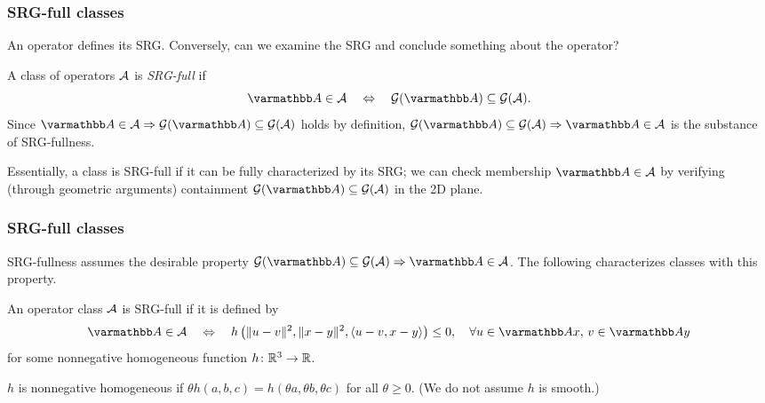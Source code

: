 \documentclass[10pt,mathserif]{beamer}
\begin{document}
\begin{frame}
\frametitle{SRG-full classes} 
An operator defines its SRG.
Conversely, can we examine the SRG and conclude something about the operator?

\vspace{0.2in}

A class of operators ${\mathcal{A}}$ is \emph{SRG-full} if
%
\[
\opA\in \cA
\quad\Leftrightarrow\quad
\cG(\opA)\subseteq\cG(\cA).
\]
%
Since $\opA\in \cA\Rightarrow\cG(\opA)\subseteq \cG(\cA)$ holds by definition, $\cG(\opA)\subseteq \cG(\cA)\Rightarrow \opA\in \cA$ is the substance of SRG-fullness.

\vspace{0.2in}

Essentially, a class is SRG-full if it can be fully characterized by its SRG;
we can check membership $\opA\in \cA$ by verifying (through geometric arguments) containment $\cG(\opA)\subseteq \cG(\cA)$ in the 2D plane. 


\end{frame}


\begin{frame}
\frametitle{SRG-full classes} 
SRG-fullness assumes the desirable property $\cG(\opA)\subseteq \cG(\cA)\Rightarrow \opA\in \cA$.
The following characterizes classes with this property.
\begin{theorem} \label{thm:srg-full}
An operator class ${\mathcal{A}}$ is SRG-full if it is defined by
\[
\opA\in \cA\quad\Leftrightarrow\quad
h\left(\|u-v\|^2,\|x-y\|^2,\langle u-v,x-y\rangle\right)\le 0,
\quad \forall u\in \opA x,\,v\in \opA y
\]
for some nonnegative homogeneous function $h\colon\mathbb{R}^3\rightarrow\mathbb{R}$.
\end{theorem}

\vspace{0.2in}

$h$ is nonnegative homogeneous if $\theta h(a,b,c)= h(\theta a,\theta b,\theta c)$ for all $\theta\ge 0$. (We do not assume $h$ is smooth.)

\end{frame}
\end{document}
